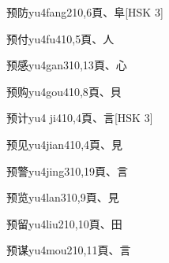 \begin{EntryWithPhonetic}{预防}{yu4fang2}{10,6}{⾴、⾩}[HSK 3]
\end{EntryWithPhonetic}

\begin{EntryWithPhonetic}{预付}{yu4fu4}{10,5}{⾴、⼈}
\end{EntryWithPhonetic}

\begin{EntryWithPhonetic}{预感}{yu4gan3}{10,13}{⾴、⼼}
\end{EntryWithPhonetic}

\begin{EntryWithPhonetic}{预购}{yu4gou4}{10,8}{⾴、⾙}
\end{EntryWithPhonetic}

\begin{EntryWithPhonetic}{预计}{yu4 ji4}{10,4}{⾴、⾔}[HSK 3]
\end{EntryWithPhonetic}

\begin{EntryWithPhonetic}{预见}{yu4jian4}{10,4}{⾴、⾒}
\end{EntryWithPhonetic}

\begin{EntryWithPhonetic}{预警}{yu4jing3}{10,19}{⾴、⾔}
\end{EntryWithPhonetic}

\begin{EntryWithPhonetic}{预览}{yu4lan3}{10,9}{⾴、⾒}
\end{EntryWithPhonetic}

\begin{EntryWithPhonetic}{预留}{yu4liu2}{10,10}{⾴、⽥}
\end{EntryWithPhonetic}

\begin{EntryWithPhonetic}{预谋}{yu4mou2}{10,11}{⾴、⾔}
\end{EntryWithPhonetic}

